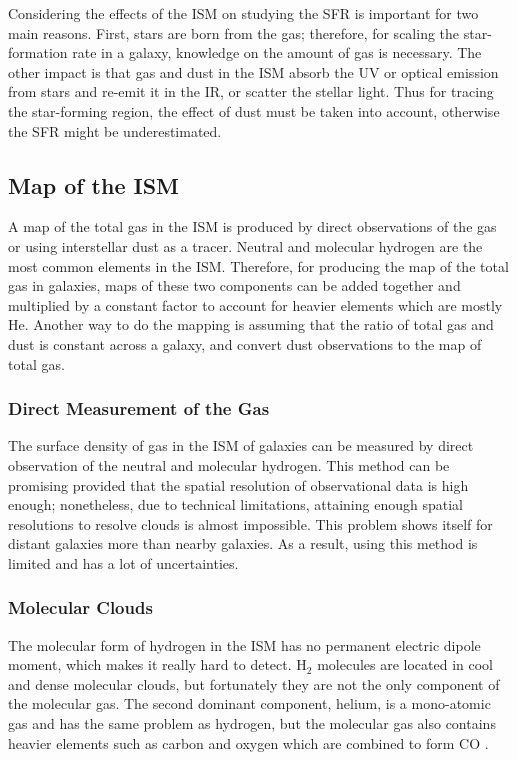 Considering the effects of the ISM on studying the SFR is important for two main reasons. First, stars are born from the gas; therefore, for scaling the star-formation rate in a galaxy, knowledge on the amount of gas is necessary. The other impact is that gas and dust in the ISM absorb the UV or optical emission from stars and re-emit it in the IR, or scatter the stellar light. Thus for tracing the star-forming region, the effect of dust must be taken into account, otherwise the SFR might be underestimated. 

\subsection{Map of the ISM}
\label{sec: ismmap}


A map of the total gas in the ISM is produced by direct observations of the gas or using interstellar dust as a tracer. Neutral and molecular hydrogen are the most common elements in the ISM. Therefore, for producing the map of the total gas in galaxies, maps of these two components can be added together and multiplied by a constant factor to account for heavier elements which are mostly He. Another way to do the mapping is assuming that the ratio of total gas and dust is constant across a galaxy, and convert dust observations to the map of total gas.

\subsubsection{Direct Measurement of the Gas}

The surface density of gas in the ISM of galaxies can be measured by direct observation of the neutral and molecular hydrogen. This method can be promising provided that the spatial resolution of observational data is high enough; nonetheless, due to technical limitations, attaining enough spatial resolutions to resolve clouds is almost impossible. This problem shows itself for distant galaxies more than nearby galaxies. As a result, using this method is limited and has a lot of uncertainties. 
 
\subsubsection*{Molecular Clouds}

 The molecular form of hydrogen in the ISM has no permanent electric dipole moment, which makes it really hard to detect. H$_2$ molecules are located in cool and dense molecular clouds, but fortunately they are not the only component of the molecular gas. The second dominant component, helium, is a mono-atomic gas and has the same problem as hydrogen, but the molecular gas also contains heavier elements such as carbon and oxygen which are combined to form CO \citep{Bolato13}. 
 
